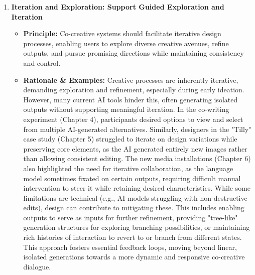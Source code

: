 \begin{enumerate}[label=\arabic*., wide, labelindent=0pt]
\item \textbf{Iteration and Exploration: Support Guided Exploration and Iteration}
    \begin{itemize}[label=\textbullet, leftmargin=*]
        \item \textbf{Principle:} Co-creative systems should facilitate iterative design processes, enabling users to explore diverse creative avenues, refine outputs, and pursue promising directions while maintaining consistency and control.
        \item \textbf{Rationale \& Examples:} Creative processes are inherently iterative, demanding exploration and refinement, especially during early ideation. However, many current AI tools hinder this, often generating isolated outputs without supporting meaningful iteration. In the co-writing experiment (Chapter 4), participants desired options to view and select from multiple AI-generated alternatives. Similarly, designers in the "Tilly" case study (Chapter 5) struggled to iterate on design variations while preserving core elements, as the AI generated entirely new images rather than allowing consistent editing. The new media installations (Chapter 6) also highlighted the need for iterative collaboration, as the language model sometimes fixated on certain outputs, requiring difficult manual intervention to steer it while retaining desired characteristics. While some limitations are technical (e.g., AI models struggling with non-destructive edits), design can contribute to mitigating these. This includes enabling outputs to serve as inputs for further refinement, providing "tree-like" generation structures for exploring branching possibilities, or maintaining rich histories of interaction to revert to or branch from different states. This approach fosters essential feedback loops, moving beyond linear, isolated generations towards a more dynamic and responsive co-creative dialogue.
    \end{itemize}


\end{enumerate}
